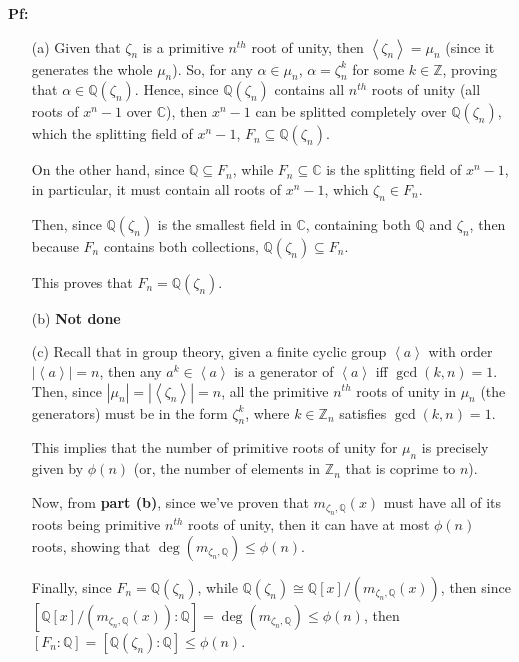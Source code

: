 \documentclass{article}
\begin{document}
\textbf{Pf:}
\begin{itemize}
    \item[(a)] Given that $\zeta_n$ is a primitive $n^{th}$ root of unity, then $\left<\zeta_n\right>=\mu_n$ (since it generates the whole $\mu_n$).
    So, for any $\alpha\in \mu_n$, $\alpha=\zeta_n^k$ for some $k\in\mathbb{Z}$, proving that $\alpha\in\mathbb{Q}(\zeta_n)$. Hence, since $\mathbb{Q}(\zeta_n)$ contains all $n^{th}$ roots of unity (all roots of $x^n-1$ over $\mathbb{C}$),
    then $x^n-1$ can be splitted completely over $\mathbb{Q}(\zeta_n)$, which the splitting field of $x^n-1$, $F_n\subseteq \mathbb{Q}(\zeta_n)$.

    On the other hand, since $\mathbb{Q}\subseteq F_n$, while $F_n\subseteq\mathbb{C}$ is the splitting field of $x^n-1$, in particular, it must contain all roots of $x^n-1$, which $\zeta_n\in F_n$.

    Then, since $\mathbb{Q}(\zeta_n)$ is the smallest field in $\mathbb{C}$, containing both $\mathbb{Q}$ and $\zeta_n$, then because $F_n$ contains both collections, $\mathbb{Q}(\zeta_n)\subseteq F_n$.

    This proves that $F_n=\mathbb{Q}(\zeta_n)$.

    \hfil

    \item[(b)]\textbf{Not done}
    
    \hfil

    \item[(c)] Recall that in group theory, given a finite cyclic group $\left<a\right>$ with order $|\left<a\right>|=n$, then any $a^k\in \left<a\right>$ is a generator of $\left<a\right>$ iff $\gcd(k,n)=1$.
    Then, since $|\mu_n|=|\left<\zeta_n\right>|=n$, all the primitive $n^{th}$ roots of unity in $\mu_n$ (the generators) must be in the form $\zeta_n^k$, where $k\in\mathbb{Z}_n$ satisfies $\gcd(k,n)=1$.

    This implies that the number of primitive roots of unity for $\mu_n$ is precisely given by $\phi(n)$ (or, the number of elements in $\mathbb{Z}_n$ that is coprime to $n$).

    Now, from \textbf{part (b)}, since we've proven that $m_{\zeta_n,\mathbb{Q}}(x)$ must have all of its roots being primitive $n^{th}$ roots of unity,
    then it can have at most $\phi(n)$ roots, showing that $\deg(m_{\zeta_n,\mathbb{Q}})\leq \phi(n)$.

    Finally, since $F_n=\mathbb{Q}(\zeta_n)$, while $\mathbb{Q}(\zeta_n)\cong \mathbb{Q}[x]/(m_{\zeta_n,\mathbb{Q}}(x))$, then since $[\mathbb{Q}[x]/(m_{\zeta_n,\mathbb{Q}}(x)):\mathbb{Q}]=\deg(m_{\zeta_n,\mathbb{Q}})\leq \phi(n)$,
    then $[F_n:\mathbb{Q}]=[\mathbb{Q}(\zeta_n):\mathbb{Q}]\leq \phi(n)$.
    
\end{itemize}
\end{document}
